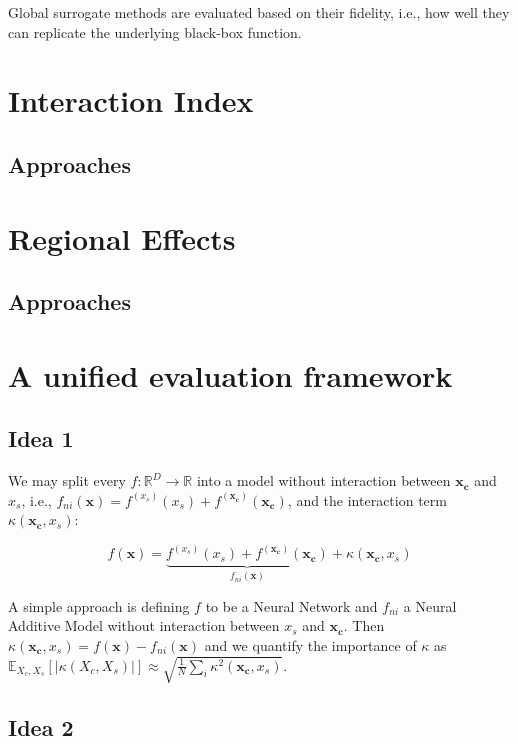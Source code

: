 \documentclass[12pt]{article}
\newcommand{\xb}{\mathbf{x}}
\newcommand{\xc}{\mathbf{x_c}}
\newcommand{\fxc}{f^{(\xc)}}
\newcommand{\fxs}{f^{(x_s)}}
\begin{document}
Global surrogate methods are evaluated based on their fidelity, i.e.,
how well they can replicate the underlying black-box function.

    \section{Interaction Index}
    \subsection{Approaches}
    \section{Regional Effects}
    \subsection{Approaches}

    \section{A unified evaluation framework}

    \subsection{Idea 1}

    We may split every $f: \mathbb{R}^D \rightarrow \mathbb{R}$ into
    a model without interaction between $\xc$ and $x_s$,
    i.e., $f_{ni}(\xb) = \fxs(x_s) +  \fxc(\xc)$,
    and the interaction term $\kappa(\xc, x_s)$:

    \[
      f(\xb) = \underbrace{\fxs(x_s) +  \fxc(\xc)}_{f_{ni}(\xb)} + \kappa(\xc, x_s)
    \]

    A simple approach is defining \(f\) to be a Neural Network and \(f_{ni}\) a Neural Additive Model without interaction
    between \(x_s\) and \(\xc\). Then \(\kappa(\xc, x_s) = f(\xb) - f_{ni}(\xb)\) and we quantify the importance of \(\kappa\) as \(\mathbb{E}_{X_c, X_s} \left [ |\kappa(X_c, X_s)| \right ] \approx \sqrt{\frac{1}{N} \sum_i \kappa^2(\xc, x_s)} \).

    \subsection{Idea 2}
\end{document}
